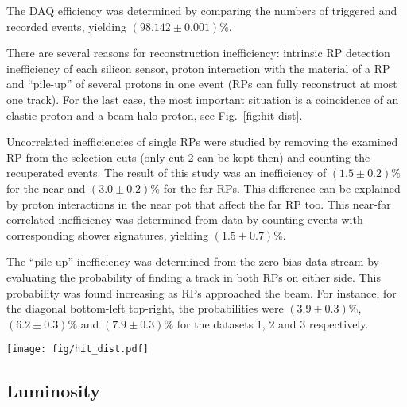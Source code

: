 \documentclass[doublecol]{../macros/epl2}
\def\un#1{\,{\rm #1}}
\begin{document}
The DAQ efficiency was determined by comparing the numbers of triggered and recorded events, yielding $(98.142 \pm 0.001)\%$.

There are several reasons for reconstruction inefficiency: intrinsic RP detection inefficiency of each silicon sensor, proton interaction with the material of a RP and ``pile-up'' of several protons in one event (RPs can fully reconstruct at most one track). For the last case, the most important situation is a coincidence of an elastic proton and a beam-halo proton, see Fig.~\ref{fig:hit dist}.

Uncorrelated inefficiencies of single RPs were studied by removing the examined RP from the selection cuts (only cut 2 can be kept then) and counting the recuperated events. The result of this study was an inefficiency of $(1.5 \pm 0.2)\%$ for the near and $(3.0 \pm 0.2)\%$ for the far RPs. This difference can be explained by proton interactions in the near pot that affect the far RP too. This near-far correlated inefficiency was determined from data by counting events with corresponding shower signatures, yielding $(1.5\pm 0.7)\%$.

The ``pile-up'' inefficiency was determined from the zero-bias data stream by evaluating the probability of finding a track in both RPs on either side. This probability was found increasing as RPs approached the beam. For instance, for the diagonal bottom-left top-right, the probabilities were $(3.9 \pm 0.3)\%$, $(6.2 \pm 0.3)\%$ and $(7.9 \pm 0.3)\%$ for the datasets 1, 2 and 3 respectively.


\begin{figure*}
\begin{center}
\texttt{[image: fig/hit\_dist.pdf]}
\vskip-5mm
\caption{Hit distributions from dataset 3 in the far unit of the $220\un{m}$ station, right arm. Left: with diagonal cut only, Right: with all the elastic selection cuts (see Tab.~\ref{tab:cuts}). The left plot clearly indicates the presence of the beam halo, which is eliminated by the selection cuts (the right plot). The distribution of elastic hits in the right plot is sharply cut at about $|y| = 29\un{mm}$ which is a consequence of the LHC aperture limitations. }
\label{fig:hit dist}
\end{center}
\end{figure*}

\subsection{Luminosity}
\end{document}
